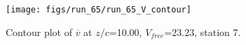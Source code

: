 \begin{figure}[H]
\centering
\texttt{[image: figs/run\_65/run\_65\_V\_contour]}
\caption{Contour plot of $\overline{v}$ at $z/c$=10.00, $V_{free}$=23.23, station 7.}
\label{fig:run_65_V_contour}
\end{figure}


